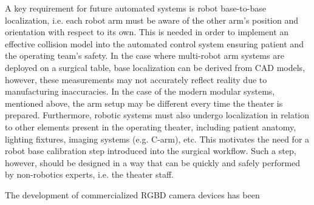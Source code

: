 A key requirement for future automated systems is robot base-to-base localization, i.e. each robot arm must be aware of the other arm's position and orientation with respect to its own.
This is needed in order to implement an effective collision model into the automated control system ensuring patient and the operating team's safety.
In the case where multi-robot arm systems are deployed on a surgical table, base localization can be derived from CAD models, however, these measurements may not accurately reflect reality due to manufacturing inaccuracies.
In the case of the modern modular systems, mentioned above, the arm setup may be different every time the theater is prepared.
Furthermore, robotic systems must also undergo localization in relation to other elements present in the operating theater, including patient anatomy, lighting fixtures, imaging systems (e.g. C-arm), etc.
This motivates the need for a robot base calibration step introduced into the surgical workflow.
Such a step, however, should be designed in a way that can be quickly and safely performed by non-robotics experts, i.e. the theater staff.

The development of commercialized RGBD camera devices has been  





